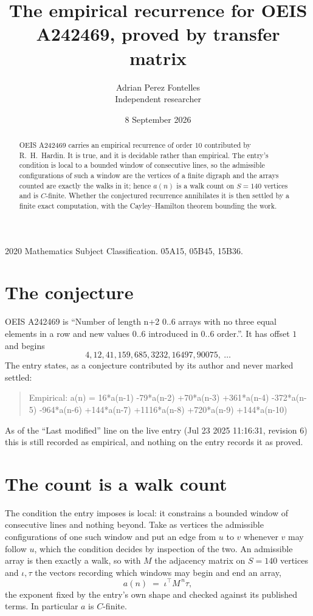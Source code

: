 \documentclass[11pt,a4paper]{article}
\title{The empirical recurrence for OEIS A242469, proved by transfer matrix}
\author{Adrian Perez Fontelles\\ \small Independent researcher}
\date{8 September 2026}
\theoremstyle{plain}
\theoremstyle{definition}
\begin{document}
\maketitle

\begin{abstract}
OEIS A242469 carries an empirical recurrence of order $10$ contributed by R.~H.~Hardin. It is
true, and it is decidable rather than empirical. The entry's condition is local to a bounded window of consecutive lines, so
the admissible configurations of such a window are the vertices of a finite digraph and the
arrays counted are exactly the walks in it; hence $a(n)$ is a walk count on $S=140$ vertices
and is $C$-finite. Whether the conjectured recurrence annihilates it is then settled by a
finite exact computation, with the Cayley--Hamilton theorem bounding the work.
\end{abstract}

\noindent\small 2020 Mathematics Subject Classification. 05A15, 05B45, 15B36.\normalsize

\section{The conjecture}

OEIS A242469 is ``Number of length n+2 0..6 arrays with no three equal elements in a row and new values 0..6 introduced in 0..6 order.''. It has offset $1$ and begins
\[
4, 12, 41, 159, 685, 3232, 16497, 90075,\ \dots
\]
The entry states, as a conjecture contributed by its author and never marked settled:
\begin{quote}
Empirical: a(n) = 16*a(n-1) -79*a(n-2) +70*a(n-3) +361*a(n-4) -372*a(n-5) -964*a(n-6) +144*a(n-7) +1116*a(n-8) +720*a(n-9) +144*a(n-10)
\end{quote}
As of the ``Last modified'' line on the live entry (Jul 23 2025 11:16:31, revision 6) this is still
recorded as empirical, and nothing on the entry records it as proved.

\section{The count is a walk count}

The condition the entry imposes is local: it constrains a bounded window of consecutive lines and nothing beyond. Take as
vertices the admissible configurations of one such window and put an edge from $u$ to $v$
whenever $v$ may follow $u$, which the condition decides by inspection of the two. An
admissible array is then exactly a walk, so with $M$ the adjacency matrix on $S=140$ vertices
and $\iota,\tau$ the vectors recording which windows may begin and end an array,
\[
a(n)\;=\;\iota^{\!\top}M^{\,n}\tau ,
\]
the exponent fixed by the entry's own shape and checked against its published terms. In
particular $a$ is $C$-finite.
\end{document}
